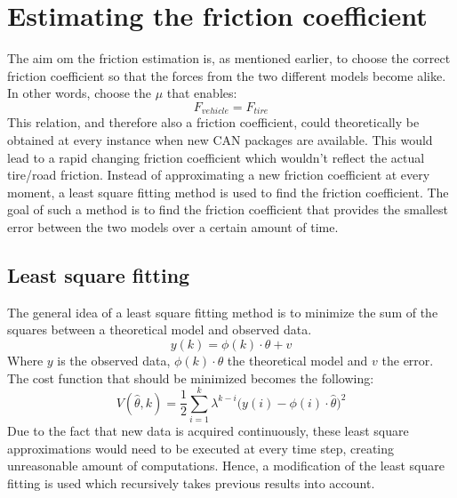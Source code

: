 \section{Estimating the friction coefficient}
The aim om the friction estimation is, as mentioned earlier, to choose the correct friction coefficient so that the forces from the two different models become alike. In other words, choose the $ \mu $ that enables:
\begin{equation}
	F_{vehicle} = F_{tire}
\end{equation}
This relation, and therefore also a friction coefficient, could theoretically be obtained at every instance when new CAN packages are available. This would lead to a rapid changing friction coefficient which wouldn't reflect the actual tire/road friction. Instead of approximating a new friction coefficient at every moment, a least square fitting method is used to find the friction coefficient. The goal of such a method is to find the friction coefficient that provides the smallest error between the two models over a certain amount of time. 

\subsection{Least square fitting}
The general idea of a least square fitting method is to minimize the sum of the squares between a theoretical model and observed data. 
\begin{equation} 
	y(k) = \phi(k)\cdot\theta + v
	\label{eq:least_square}
\end{equation}
Where $ y $ is the observed data, $ \phi(k)\cdot\theta $ the theoretical model and $ v $ the error. The cost function that should be minimized becomes the following:
\begin{equation}
	V(\hat{\theta}, k) = \dfrac{1}{2} \sum_{i=1}^{k} \lambda^{k-i}\Big(y(i) - \phi(i)\cdot\hat\theta \Big)^2
\end{equation}
Due to the fact that new data is acquired continuously, these least square approximations would need to be executed at every time step, creating unreasonable amount of computations. Hence, a modification of the least square fitting is used which recursively takes previous results into account.


